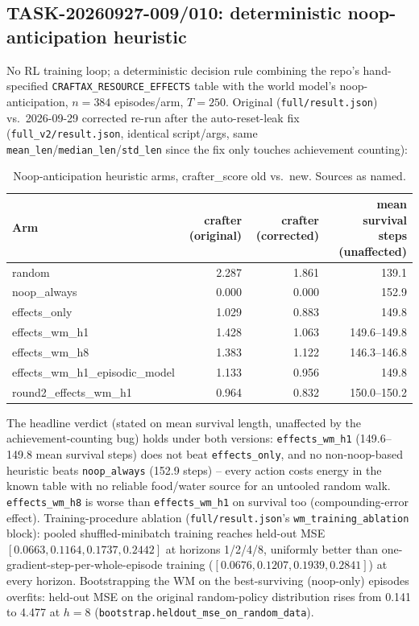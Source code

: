 \documentclass[11pt]{article}
\newcommand{\srcpath}[1]{\texttt{\small #1}}
\begin{document}
\subsection{TASK-20260927-009/010: deterministic noop-anticipation heuristic}

No RL training loop; a deterministic decision rule combining the repo's hand-specified
\texttt{CRAFTAX\_RESOURCE\_EFFECTS} table with the world model's noop-anticipation, $n{=}384$
episodes/arm, $T{=}250$. Original (\srcpath{full/result.json}) vs.\ 2026-09-29 corrected re-run
after the auto-reset-leak fix (\srcpath{full\_v2/result.json}, identical script/args, same
\texttt{mean\_len}/\texttt{median\_len}/\texttt{std\_len} since the fix only touches achievement
counting):

\begin{table}[h]
\centering
\caption{Noop-anticipation heuristic arms, crafter\_score old vs.\ new. Sources as named.}
\begin{tabular}{lrrr}
\toprule
Arm & crafter (original) & crafter (corrected) & mean survival steps (unaffected) \\
\midrule
random & 2.287 & 1.861 & 139.1 \\
noop\_always & 0.000 & 0.000 & 152.9 \\
effects\_only & 1.029 & 0.883 & 149.8 \\
effects\_wm\_h1 & 1.428 & 1.063 & 149.6--149.8 \\
effects\_wm\_h8 & 1.383 & 1.122 & 146.3--146.8 \\
effects\_wm\_h1\_episodic\_model & 1.133 & 0.956 & 149.8 \\
round2\_effects\_wm\_h1 & 0.964 & 0.832 & 150.0--150.2 \\
\bottomrule
\end{tabular}
\end{table}

The headline verdict (stated on mean survival length, unaffected by the achievement-counting bug)
holds under both versions: \texttt{effects\_wm\_h1} (149.6--149.8 mean survival steps) does not beat
\texttt{effects\_only}, and no non-noop-based heuristic beats \texttt{noop\_always} (152.9 steps) --
every action costs energy in the known table with no reliable food/water source for an untooled
random walk. \texttt{effects\_wm\_h8} is worse than \texttt{effects\_wm\_h1} on survival too
(compounding-error effect). Training-procedure ablation
(\srcpath{full/result.json}'s \texttt{wm\_training\_ablation} block): pooled shuffled-minibatch
training reaches held-out MSE $[0.0663, 0.1164, 0.1737, 0.2442]$ at horizons 1/2/4/8, uniformly
better than one-gradient-step-per-whole-episode training ($[0.0676, 0.1207, 0.1939, 0.2841]$) at
every horizon. Bootstrapping the WM on the best-surviving (noop-only) episodes overfits: held-out
MSE on the original random-policy distribution rises from 0.141 to 4.477 at $h{=}8$
(\texttt{bootstrap.heldout\_mse\_on\_random\_data}).
\end{document}
